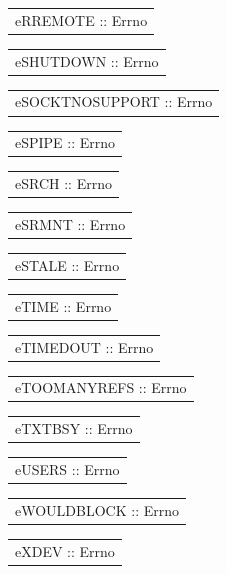 \begin{haddockdesc}
\item[\begin{tabular}{@{}l}
eRREMOTE :: Errno
\end{tabular}]
\item[\begin{tabular}{@{}l}
eSHUTDOWN :: Errno
\end{tabular}]
\item[\begin{tabular}{@{}l}
eSOCKTNOSUPPORT :: Errno
\end{tabular}]
\item[\begin{tabular}{@{}l}
eSPIPE :: Errno
\end{tabular}]
\item[\begin{tabular}{@{}l}
eSRCH :: Errno
\end{tabular}]
\item[\begin{tabular}{@{}l}
eSRMNT :: Errno
\end{tabular}]
\item[\begin{tabular}{@{}l}
eSTALE :: Errno
\end{tabular}]
\item[\begin{tabular}{@{}l}
eTIME :: Errno
\end{tabular}]
\item[\begin{tabular}{@{}l}
eTIMEDOUT :: Errno
\end{tabular}]
\item[\begin{tabular}{@{}l}
eTOOMANYREFS :: Errno
\end{tabular}]
\item[\begin{tabular}{@{}l}
eTXTBSY :: Errno
\end{tabular}]
\item[\begin{tabular}{@{}l}
eUSERS :: Errno
\end{tabular}]
\item[\begin{tabular}{@{}l}
eWOULDBLOCK :: Errno
\end{tabular}]
\item[\begin{tabular}{@{}l}
eXDEV :: Errno
\end{tabular}]
\end{haddockdesc}
